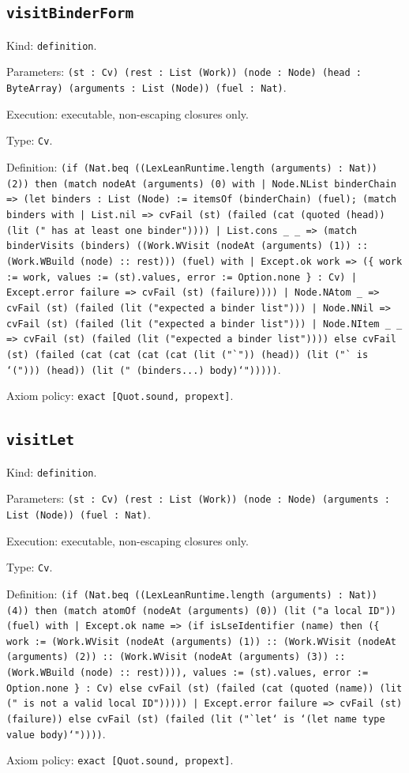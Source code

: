 \documentclass[11pt]{article}
\begin{document}
\subsection*{\texttt{visitBinderForm}}
\noindent Kind: \texttt{definition}.\par
\noindent Parameters: \texttt{(st : Cv) (rest : List (Work)) (node : Node) (head : ByteArray) (arguments : List (Node)) (fuel : Nat)}.\par
\noindent Execution: executable, non-escaping closures only.\par
\noindent Type: \texttt{Cv}.\par
\noindent Definition: \texttt{(if (Nat.beq ((LexLeanRuntime.length (arguments) : Nat)) (2)) then (match nodeAt (arguments) (0) with | Node.NList binderChain => (let binders : List (Node) := itemsOf (binderChain) (fuel); (match binders with | List.nil => cvFail (st) (failed (cat (quoted (head)) (lit (" has at least one binder")))) | List.cons \_ \_ => (match binderVisits (binders) ((Work.WVisit (nodeAt (arguments) (1)) :: (Work.WBuild (node) :: rest))) (fuel) with | Except.ok work => (\{ work := work, values := (st).values, error := Option.none \} : Cv) | Except.error failure => cvFail (st) (failure)))) | Node.NAtom \_ => cvFail (st) (failed (lit ("expected a binder list"))) | Node.NNil => cvFail (st) (failed (lit ("expected a binder list"))) | Node.NItem \_ \_ => cvFail (st) (failed (lit ("expected a binder list")))) else cvFail (st) (failed (cat (cat (cat (cat (lit ("`")) (head)) (lit ("` is `("))) (head)) (lit (" (binders...) body)`")))))}.\par
\noindent Axiom policy: \texttt{exact [Quot.sound, propext]}.\par
\subsection*{\texttt{visitLet}}
\noindent Kind: \texttt{definition}.\par
\noindent Parameters: \texttt{(st : Cv) (rest : List (Work)) (node : Node) (arguments : List (Node)) (fuel : Nat)}.\par
\noindent Execution: executable, non-escaping closures only.\par
\noindent Type: \texttt{Cv}.\par
\noindent Definition: \texttt{(if (Nat.beq ((LexLeanRuntime.length (arguments) : Nat)) (4)) then (match atomOf (nodeAt (arguments) (0)) (lit ("a local ID")) (fuel) with | Except.ok name => (if isLseIdentifier (name) then (\{ work := (Work.WVisit (nodeAt (arguments) (1)) :: (Work.WVisit (nodeAt (arguments) (2)) :: (Work.WVisit (nodeAt (arguments) (3)) :: (Work.WBuild (node) :: rest)))), values := (st).values, error := Option.none \} : Cv) else cvFail (st) (failed (cat (quoted (name)) (lit (" is not a valid local ID"))))) | Except.error failure => cvFail (st) (failure)) else cvFail (st) (failed (lit ("`let` is `(let name type value body)`"))))}.\par
\noindent Axiom policy: \texttt{exact [Quot.sound, propext]}.\par
\end{document}

